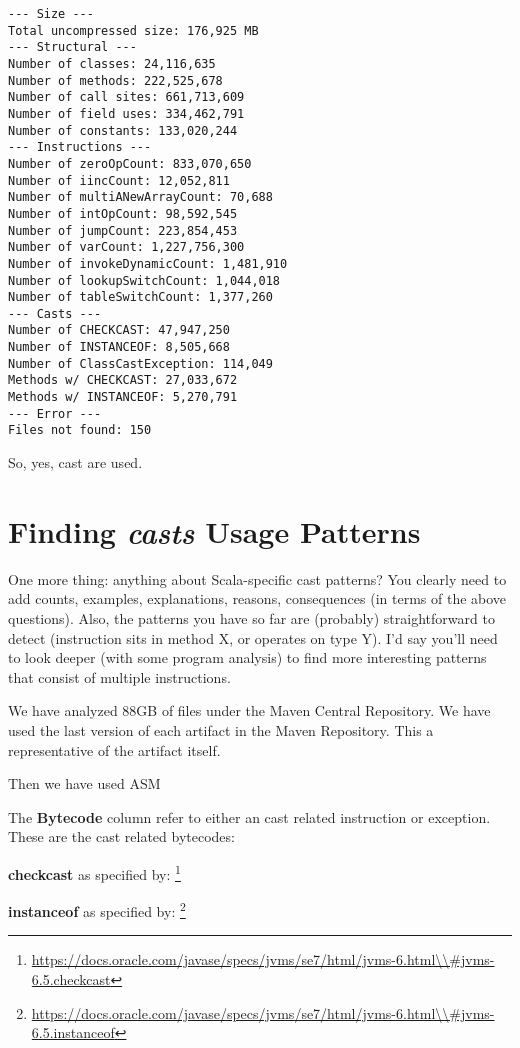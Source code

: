 \documentclass{usiinfdocprop}
\begin{document}
\begin{verbatim}
--- Size --- 
Total uncompressed size: 176,925 MB 
--- Structural --- 
Number of classes: 24,116,635 
Number of methods: 222,525,678 
Number of call sites: 661,713,609 
Number of field uses: 334,462,791 
Number of constants: 133,020,244 
--- Instructions --- 
Number of zeroOpCount: 833,070,650 
Number of iincCount: 12,052,811 
Number of multiANewArrayCount: 70,688 
Number of intOpCount: 98,592,545 
Number of jumpCount: 223,854,453 
Number of varCount: 1,227,756,300 
Number of invokeDynamicCount: 1,481,910 
Number of lookupSwitchCount: 1,044,018 
Number of tableSwitchCount: 1,377,260 
--- Casts --- 
Number of CHECKCAST: 47,947,250 
Number of INSTANCEOF: 8,505,668 
Number of ClassCastException: 114,049 
Methods w/ CHECKCAST: 27,033,672 
Methods w/ INSTANCEOF: 5,270,791 
--- Error --- 
Files not found: 150 
\end{verbatim}

So, yes, cast are used. 

\section{Finding \emph{casts} Usage Patterns \label{org68b50a1}}
\label{sec:orgcd146e1}

One more thing: anything about Scala-specific cast patterns? 
You clearly need to add counts, examples, explanations, reasons, consequences (in terms of the above questions). 
Also, the patterns you have so far are (probably) straightforward to detect (instruction sits in method X, or operates on type Y). 
I'd say you'll need to look deeper (with some program analysis) to find more interesting patterns that consist of multiple instructions. 

We have analyzed 88GB of  files under the Maven Central Repository. 
We have used the last version of each artifact in the Maven Repository. 
This a representative of the artifact itself. 

Then we have used ASM \cite{Bruneton02asm:a} 

The \textbf{Bytecode} column refer to either an cast related instruction or exception. 
These are the cast related bytecodes: 

\textbf{checkcast} as specified by: 
\footnote{\url{https://docs.oracle.com/javase/specs/jvms/se7/html/jvms-6.html\\\#jvms-6.5.checkcast}} 

\textbf{instanceof} as specified by: 
\footnote{\url{https://docs.oracle.com/javase/specs/jvms/se7/html/jvms-6.html\\\#jvms-6.5.instanceof}} 
\end{document}
